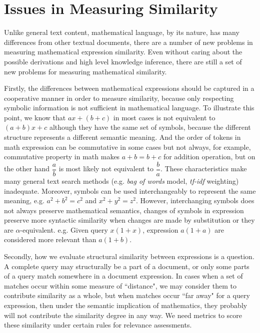 \section{Issues in Measuring Similarity}
\label{measure_sim}
Unlike general text content, mathematical language, by its nature, has many differences from other textual documents, there are a number of new problems in measuring mathematical expression similarity. 
Even without caring about the possible derivations and high level knowledge inference, there are still a set of new problems for measuring mathematical similarity.

Firstly, the differences between mathematical expressions should be captured in a cooperative manner in order to measure similarity,
because only respecting symbolic information is not sufficient in mathematical language.
To illustrate this point, we know that
$ax+(b+c)$ in most cases is not equivalent to $(a+b)x+c$ although they have the same set of symbols, because the different structure represents a different semantic meaning.
And the order of tokens in math expression can be commutative in some cases but not always, for example, commutative property in math makes $a+b=b+c$ for addition operation, but on the other hand $\dfrac a b$ is most likely not equivalent to $\dfrac b a$.
These characteristics make many general text search methods (e.g. \textit{bag of words} model, \textit{tf-idf} weighting) inadequate.  
Moreover, symbols can be used interchangeably to represent the same meaning, e.g. $a^2+b^2=c^2$ and $x^2+y^2=z^2$. 
However, interchanging symbols does not always preserve mathematical semantics, changes of symbols in expression preserve more syntactic similarity when changes are made by substitution or they are $\alpha$-equivalent. e.g. Given query $x(1+x)$, expression $a(1+a)$ are considered more relevant than $a(1+b)$. 

Secondly, how we evaluate structural similarity between expressions is a question. A complete query may structurally be a part of a document, or only some parts of a query match somewhere in a document expression.
In cases when a set of matches occur within some measure of ``distance", we may consider them to contribute similarity as a whole, but when matches occur ``far away" for a query expression, then under the semantic implication of mathematics, they probably will not contribute the similarity degree in any way.
We need metrics to score these similarity under certain rules for relevance assessments. 

